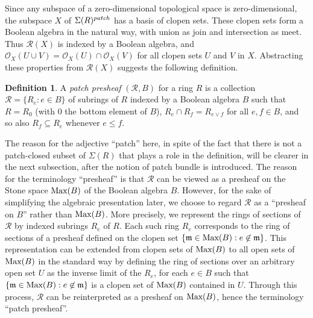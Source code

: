 \documentclass[11pt]{amsart}
\def\m{{\mathfrak m}} %
\def\O{{\mathcal{O}}}
\theoremstyle{definition}
\newtheorem{definition}[theorem]{Definition}
\def\Max{\mbox{\rm Max}}
\def\cal{\mathcal}
\begin{document}
Since any subspace of a zero-dimensional topological space is zero-dimensional, the subspace $X$ of ${\Sigma}(R)^{\rm patch}$ has a basis of clopen sets. These clopen sets form a Boolean algebra in the natural way, with union as join and intersection as meet. Thus ${\cal R}(X)$ is indexed by a Boolean algebra, and $\O_X(U \cup V) = \O_X(U) \cap \O_X(V)$ for all clopen sets $U$ and $V$ in $X$.  Abstracting these properties from ${\cal R}(X)$  suggests the following definition.  



\begin{definition}\label{dfn: patch presheaf} A {\it patch presheaf} $({\cal R}, B)$ for a ring $R$ is a collection ${\cal R}=\{R_e:e \in B\}$  of subrings of $R$ indexed by a Boolean algebra $B$ such that $R=R_0$ (with $0$ the bottom element of $B$), $R_e \cap R_f = R_{e \vee f}$ for all $e,f \in B$, and so also $R_f \subseteq R_e$ whenever $e \leq f$. \end{definition} 


The reason for  the adjective ``patch'' here, in spite of the fact that there is not a patch-closed subset of $\Sigma(R)$ that plays a role in the definition, will be clearer in the next subsection, after the notion of patch bundle is introduced. 
 The reason for the terminology ``presheaf''  is that  ${\cal R}$ can be viewed as a presheaf on the Stone space $\Max(B)$ of the Boolean algebra $B$. However, for the sake of simplifying the algebraic presentation later, we choose to regard ${\cal R}$ as a ``presheaf on $B$'' rather than $\Max(B)$. More precisely, we represent the rings of sections of ${\cal R}$ by indexed subrings $R_e$ of $R$. Each such ring $R_e$ corresponds to the ring of sections of a presheaf defined on the clopen set $\{\m \in \Max(B):e \not \in \m\}$.  This representation can be extended from clopen sets of $\Max(B)$ to all open sets of $\Max(B)$ in the standard way by defining the ring of sections over an arbitrary open set $U$ as the inverse limit of the $R_e$, for each $e \in B$ such that  $\{\m \in \Max(B):e \not \in \m\} $ is a clopen set of $\Max(B)$ contained in $U$. Through this process, ${\cal R}$ can be reinterpreted as a presheaf on $\Max(B)$, hence the terminology ``patch presheaf''.
 
\end{document}
